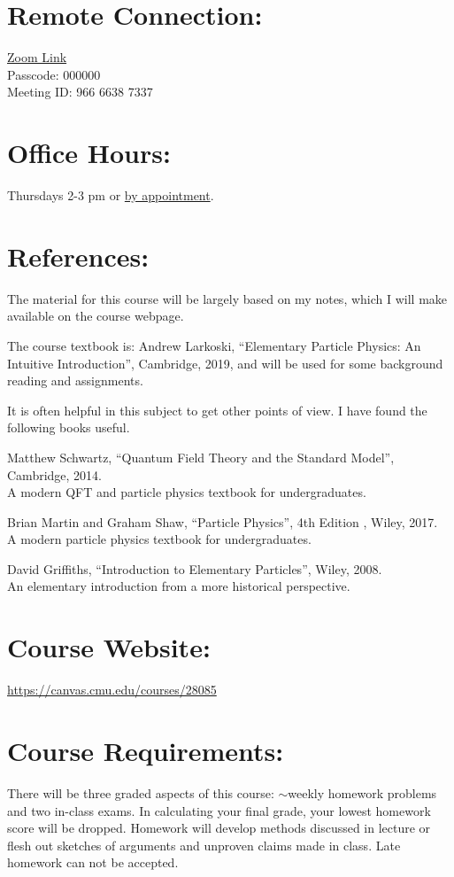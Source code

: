 \documentclass[margin,line]{res}
\begin{document}
\begin{resume}
\section{Remote Connection:}
\href{https://cmu.zoom.us/j/96666387337?pwd=dUpDUC8xelJrc2Y2djcrRVR2K2tmUT09}{Zoom Link} \\
Passcode: 000000 \\
Meeting ID: 966 6638 7337

 
\section{Office Hours:}
Thursdays 2-3 pm or \href{https://calendly.com/johnalison/meeting}{by appointment}.


\section{References:}
The material for this course will be largely based on my  notes, which I will make available on the course webpage. 

The course textbook is:
Andrew Larkoski, ``Elementary Particle Physics: An Intuitive Introduction'', Cambridge, 2019,
and will be used for some background reading and assignments.

It is often helpful in this subject to get other points of view.  
I have found the following books useful. 

Matthew Schwartz, ``Quantum Field Theory and the Standard Model'', Cambridge, 2014.\\
A modern QFT and particle physics textbook for undergraduates.

Brian Martin and Graham Shaw, ``Particle Physics'', 4th Edition , Wiley, 2017.\\
A modern particle physics textbook for undergraduates.

David Griffiths, ``Introduction to Elementary Particles'', Wiley, 2008.\\
An elementary introduction from a more historical perspective.

\section{Course Website:}  
\href{https://canvas.cmu.edu/courses/28085}{https://canvas.cmu.edu/courses/28085}

\newpage

\section{Course Requirements:}
There will be three graded aspects of this course: $\sim$weekly homework problems and two in-class exams.
In calculating your final grade, your lowest homework score will be dropped.
Homework will develop methods discussed in lecture or flesh out sketches of arguments and unproven claims made in class.
Late homework can not be accepted.


\end{resume}
\end{document}
